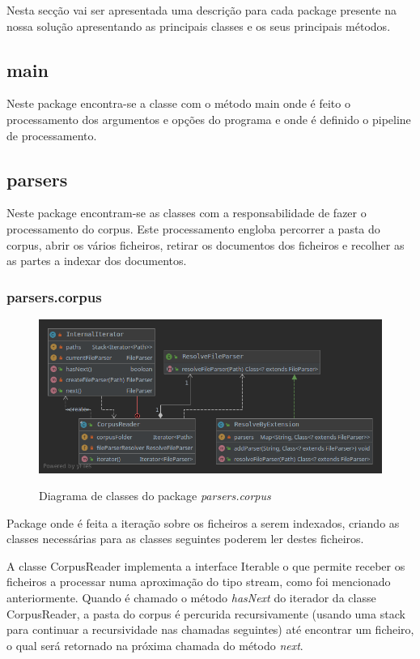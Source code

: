 \documentclass[12pt]{article}
\begin{document}
Nesta secção vai ser apresentada uma descrição para cada package presente na
nossa solução apresentando as principais classes e os seus principais métodos. 

\subsection{main}

Neste package encontra-se a classe com o método main onde é feito o
processamento dos argumentos e opções do programa e onde é definido o
pipeline de processamento.

\subsection{parsers}
Neste package encontram-se as classes com a responsabilidade de fazer
o processamento do corpus. Este processamento engloba percorrer a pasta do
corpus, abrir os vários ficheiros, retirar os documentos dos ficheiros e
recolher as as partes a indexar dos documentos.

\subsubsection{parsers.corpus}
\begin{figure}[h]
  \center
  \includegraphics[width=12cm]{packages_parsers_corpus.png}
  \label{fig:packages_parsers_corpus}
  \caption{Diagrama de classes do package \it parsers.corpus}
\end{figure}

Package onde é feita a iteração sobre os ficheiros a serem indexados, criando as classes
necessárias para as classes seguintes poderem ler destes ficheiros.

A classe CorpusReader implementa a interface Iterable o que permite receber os ficheiros
a processar numa aproximação do tipo stream, como foi mencionado anteriormente. Quando
é chamado o método {\it hasNext} do iterador da classe CorpusReader, a pasta do corpus
é percurida recursivamente (usando uma stack para continuar a recursividade nas chamadas
seguintes) até encontrar um ficheiro, o qual será retornado na próxima chamada do método
{\it next}.
\end{document}
